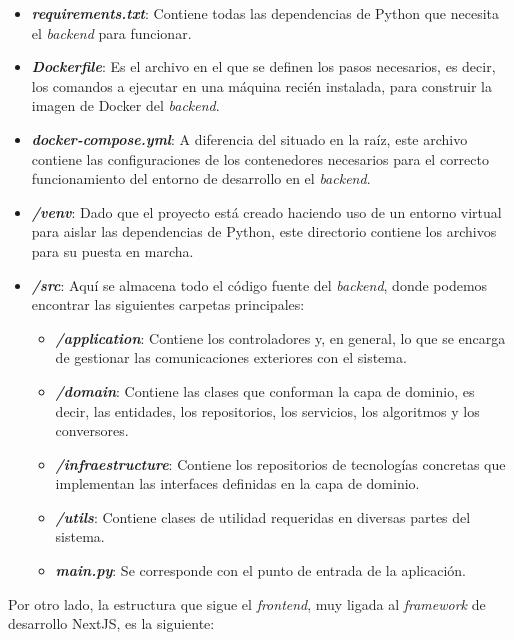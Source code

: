 \begin{itemize}
	\item \textbf{\textit{requirements.txt}}: Contiene todas las dependencias de Python que necesita el \textit{backend} para funcionar.
	\item \textbf{\textit{Dockerfile}}: Es el archivo en el que se definen los pasos necesarios, es decir, los comandos a ejecutar en una
	      máquina recién instalada, para construir la imagen de Docker del \textit{backend}.
	\item \textbf{\textit{docker-compose.yml}}: A diferencia del situado en la raíz, este archivo contiene las configuraciones de los contenedores necesarios
	      para el correcto funcionamiento del entorno de desarrollo en el \textit{backend}.
	\item \textbf{\textit{/venv}}: Dado que el proyecto está creado haciendo uso de un entorno virtual para aislar las dependencias de Python, este directorio
	      contiene los archivos para su puesta en marcha.
	\item \textbf{\textit{/src}}: Aquí se almacena todo el código fuente del \textit{backend}, donde podemos encontrar las siguientes carpetas principales:
	      \begin{itemize}
		      \item \textbf{\textit{/application}}: Contiene los controladores y, en general, lo que se encarga de gestionar las comunicaciones exteriores con el sistema.
		      \item \textbf{\textit{/domain}}: Contiene las clases que conforman la capa de dominio, es decir, las entidades, los repositorios, los servicios, los algoritmos
		            y los conversores.
		      \item \textbf{\textit{/infraestructure}}: Contiene los repositorios de tecnologías concretas que implementan las interfaces definidas en la capa de dominio.
		      \item \textbf{\textit{/utils}}: Contiene clases de utilidad requeridas en diversas partes del sistema.
		      \item \textbf{\textit{main.py}}: Se corresponde con el punto de entrada de la aplicación.
	      \end{itemize}
\end{itemize}

\bigskip
Por otro lado, la estructura que sigue el \textit{frontend}, muy ligada al \textit{framework} de desarrollo NextJS, es la siguiente:

